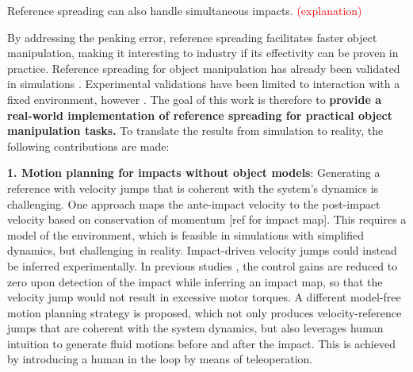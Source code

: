 \documentclass[a4paper, 10pt, conference]{ieeeconf}
\begin{document}
    Reference spreading can also handle simultaneous impacts. \cite{vansteenRobotControlSimultaneous2021} \textcolor{red}{(explanation)}

    By addressing the peaking error, reference spreading facilitates faster object manipulation, making it interesting to industry if its effectivity can be proven in practice. Reference spreading for object manipulation has already been validated in simulations \cite{vansteenRobotControlSimultaneous2021,zwartImpactAwareLearningDemonstration2019}. Experimental validations have been limited to interaction with a fixed environment, however \cite{rijnenReferenceSpreadingTracking2020,uitendaalTeachingRobotsInteraction2022}. The goal of this work is therefore to \textbf{provide a real-world implementation of reference spreading for practical object manipulation tasks.} To translate the results from simulation to reality, the following contributions are made:

    \textbf{1. Motion planning for impacts without object models}: Generating a reference with velocity jumps that is coherent with the system’s dynamics is challenging. 
    One approach maps the ante-impact velocity to the post-impact velocity based on conservation of momentum [ref for impact map]. This requires a model of the environment, which is feasible in simulations with simplified dynamics, but challenging in reality.
    Impact-driven velocity jumps could instead be inferred experimentally. In previous studies \cite{aouajPredictingPostImpactVelocity2021}, the control gains are reduced to zero upon detection of the impact while inferring an impact map, so that the velocity jump would not result in excessive motor torques.
    A different model-free motion planning strategy is proposed, which not only produces velocity-reference jumps that are coherent with the system dynamics, but also leverages human intuition to generate fluid motions before and after the impact. This is achieved by introducing a human in the loop by means of teleoperation. %
\end{document}
